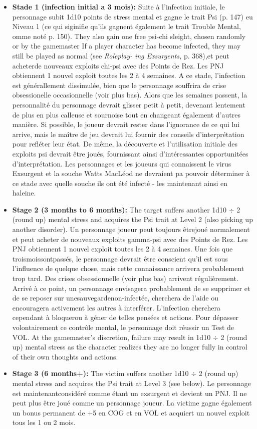 \begin{itemize} \item \textbf{Stade 1 (infection initial a 3 mois):} Suite à l'infection initiale, le personnage subit 1d10 points de stress mental et gagne le trait Psi (p. 147) eu Niveau 1 (ce qui siginifie qu'ils gagnent également le trait Trouble Mental, omme noté p. 150). They also gain one free psi-chi sleight, chosen randomly or by the gamemaster If a player character has become infected, they may still be played as normal (see \textit{Roleplay-} \textit{ing Exsurgents,} p. 368),et peut acheterde nouveaux exploits chi-psi avec des Points de Rez. Les PNJ obtiennent 1 nouvel exploit toutes les 2 à 4 semaines. A ce stade, l'infection est générallement dissimulée, bien que le personnage souffrira de crise obsessionelle occasionnelle (voir plus bas). Alors que les semaines passent, la personnalité  du personnage devrait glisser petit à petit, devenant lentement de plus en plus calleuse et sournoise tout en changeant également d'autres manière. Si possible, le joueur devrait rester dans l'ignorance de ce qui lui arrive, mais le maître de jeu devrait lui fournir des conseils d'interprétation pour refléter leur état. De même, la découverte et l'utilisation initiale des exploits psi devrait être joués, fournissant ainsi d'intéressantes opportunitées d'interprétation. Les personnages et les joueurs qui connaissent le virus Exsurgent et la souche Watts MacLéod ne devraient pa pouvoir déterminer à ce stade avec quelle souche ils ont été infecté - les maintenant ainsi en haleine. \item \textbf{Stage 2 (3 months to 6 months):} The target suffers another 1d10 $\div$ 2 (round up) mental stress and acquires the Psi trait at Level 2 (also picking up another disorder). Un personnage joueur peut toujours êtrejoué normalement et peut acheter de nouveaux exploits gamma-psi avec des Points de Rez. Les PNJ obtiennent 1 nouvel exploit toutes les 2 à 4 semaines. Une fois que troismoissontpassés, le personnage devrait être conscient qu'il est sous l'influence de quelque chose, mais cette connaissance arrivera probablement trop tard. Des crises obsessionnelle (voir plus bas) arrivent régulièrement. Arrivé à ce point, un personnage envisagera probablement de se supprimer et de se reposer sur unesauvegardenon-infectée, cherchera de l'aide ou encouragera activement les autres à interférer. L'infection cherchera cependant à bloquerou à géner de telles pensées et actions. Pour dépasser volontairement ce contrôle mental, le personnage doit réussir un Test de VOL. At the gamemaster's discretion, failure may result in 1d10 $\div$ 2 (round up) mental stress as the character realizes they are no longer fully in control of their own thoughts and actions. \item \textbf{Stage 3 (6 months+):} The victim suffers another 1d10 $\div$ 2 (round up) mental stress and acquires the Psi trait at Level 3 (see below). Le personnage est maintenantconsidéré comme étant un exsurgent et devient un PNJ. Il ne peut plus être joué comme un personnage joueur. La victime gagne également un bonus permanent de +5 en COG et en VOL et acquiert un nouvel exploit tous les 1 ou 2 mois. \end{itemize} 

